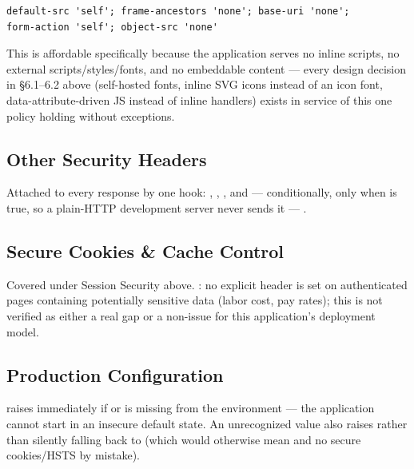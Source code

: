 \begin{lstlisting}[frame=single]
default-src 'self'; frame-ancestors 'none'; base-uri 'none';
form-action 'self'; object-src 'none'
\end{lstlisting}

This is affordable specifically because the application serves no
inline scripts, no external scripts/styles/fonts, and no embeddable
content --- every design decision in \S6.1--6.2 above (self-hosted
fonts, inline SVG icons instead of an icon font, data-attribute-driven
JS instead of inline handlers) exists in service of this one policy
holding without exceptions.

\subsection*{Other Security Headers}

Attached to every response by one  hook:
, ,
, and ---
conditionally, only when  is true, so a
plain-HTTP development server never sends it ---
.

\subsection*{Secure Cookies \& Cache Control}

Covered under Session Security above. \VERIFY{}: no explicit
 header is set on authenticated pages containing
potentially sensitive data (labor cost, pay rates); this is not
verified as either a real gap or a non-issue for this application's
deployment model.

\subsection*{Production Configuration}

 raises 
immediately if  or  is missing
from the environment --- the application cannot start in an insecure
default state. An unrecognized  value also raises
rather than silently falling back to  (which
would otherwise mean  and no secure cookies/HSTS by
mistake).

